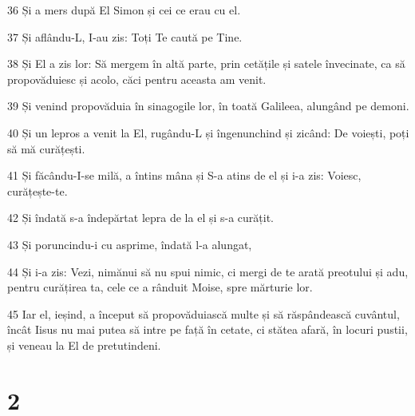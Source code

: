 \par 36 Și a mers după El Simon și cei ce erau cu el.
\par 37 Și aflându-L, I-au zis: Toți Te caută pe Tine.
\par 38 Și El a zis lor: Să mergem în altă parte, prin cetățile și satele învecinate, ca să propovăduiesc și acolo, căci pentru aceasta am venit.
\par 39 Și venind propovăduia în sinagogile lor, în toată Galileea, alungând pe demoni.
\par 40 Și un lepros a venit la El, rugându-L și îngenunchind și zicând: De voiești, poți să mă curățești.
\par 41 Și făcându-I-se milă, a întins mâna și S-a atins de el și i-a zis: Voiesc, curățește-te.
\par 42 Și îndată s-a îndepărtat lepra de la el și s-a curățit.
\par 43 Și poruncindu-i cu asprime, îndată l-a alungat,
\par 44 Și i-a zis: Vezi, nimănui să nu spui nimic, ci mergi de te arată preotului și adu, pentru curățirea ta, cele ce a rânduit Moise, spre mărturie lor.
\par 45 Iar el, ieșind, a început să propovăduiască multe și să răspândească cuvântul, încât Iisus nu mai putea să intre pe față în cetate, ci stătea afară, în locuri pustii, și veneau la El de pretutindeni.

\chapter{2}

